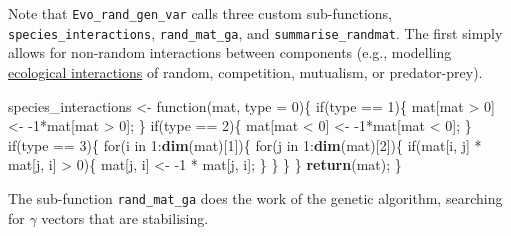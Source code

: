 \documentclass[]{article}
\newenvironment{Shaded}{\begin{snugshade}}{\end{snugshade}}
\newcommand{\KeywordTok}[1]{\textcolor[rgb]{0.13,0.29,0.53}{\textbf{{#1}}}}
\newcommand{\DataTypeTok}[1]{\textcolor[rgb]{0.13,0.29,0.53}{{#1}}}
\newcommand{\DecValTok}[1]{\textcolor[rgb]{0.00,0.00,0.81}{{#1}}}
\newcommand{\StringTok}[1]{\textcolor[rgb]{0.31,0.60,0.02}{{#1}}}
\newcommand{\NormalTok}[1]{{#1}}
\begin{document}
Note that \texttt{Evo\_rand\_gen\_var} calls three custom sub-functions,
\texttt{species\_interactions}, \texttt{rand\_mat\_ga}, and
\texttt{summarise\_randmat}. The first simply allows for non-random
interactions between components (e.g., modelling
\protect\hyperlink{ecological}{ecological interactions} of random,
competition, mutualism, or predator-prey).

\begin{Shaded}
\begin{Highlighting}[]
\NormalTok{species_interactions <-}\StringTok{ }\NormalTok{function(mat, }\DataTypeTok{type =} \DecValTok{0}\NormalTok{)\{}
    \NormalTok{if(type ==}\StringTok{ }\DecValTok{1}\NormalTok{)\{}
        \NormalTok{mat[mat >}\StringTok{ }\DecValTok{0}\NormalTok{] <-}\StringTok{ }\NormalTok{-}\DecValTok{1}\NormalTok{*mat[mat >}\StringTok{ }\DecValTok{0}\NormalTok{];}
    \NormalTok{\}}
    \NormalTok{if(type ==}\StringTok{ }\DecValTok{2}\NormalTok{)\{}
        \NormalTok{mat[mat <}\StringTok{ }\DecValTok{0}\NormalTok{] <-}\StringTok{ }\NormalTok{-}\DecValTok{1}\NormalTok{*mat[mat <}\StringTok{ }\DecValTok{0}\NormalTok{];}
    \NormalTok{\}}
    \NormalTok{if(type ==}\StringTok{ }\DecValTok{3}\NormalTok{)\{}
        \NormalTok{for(i in }\DecValTok{1}\NormalTok{:}\KeywordTok{dim}\NormalTok{(mat)[}\DecValTok{1}\NormalTok{])\{}
            \NormalTok{for(j in }\DecValTok{1}\NormalTok{:}\KeywordTok{dim}\NormalTok{(mat)[}\DecValTok{2}\NormalTok{])\{}
                \NormalTok{if(mat[i, j] *}\StringTok{ }\NormalTok{mat[j, i] >}\StringTok{ }\DecValTok{0}\NormalTok{)\{}
                    \NormalTok{mat[j, i] <-}\StringTok{ }\NormalTok{-}\DecValTok{1} \NormalTok{*}\StringTok{ }\NormalTok{mat[j, i];}
                \NormalTok{\}}
            \NormalTok{\}}
        \NormalTok{\}}
    \NormalTok{\}}
    \KeywordTok{return}\NormalTok{(mat);}
\NormalTok{\}}
\end{Highlighting}
\end{Shaded}

The sub-function \texttt{rand\_mat\_ga} does the work of the genetic
algorithm, searching for \(\gamma\) vectors that are stabilising.
\end{document}
